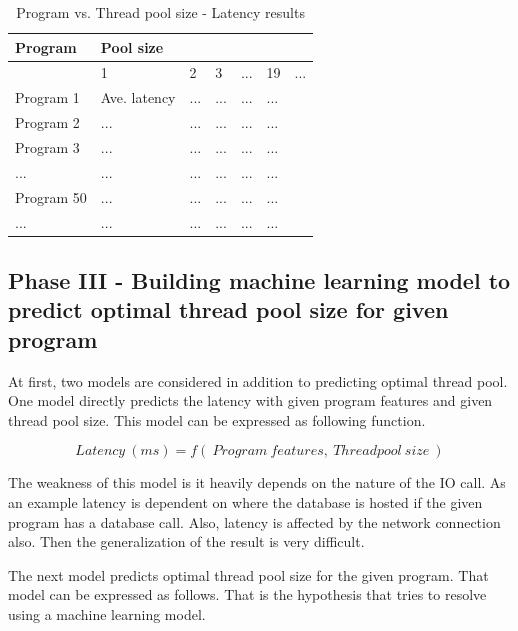 \begin{table}[]
	\caption{Program vs. Thread pool size - Latency results}
	\begin{center}
	\begin{tabular}{|l|l|l|l|l|l|l|}
		\hline
		Program    & \multicolumn{6}{l|}{Pool size}        \\ \hline
		& 1            & 2 & 3 & ... & 19 & ... \\ \hline
		Program 1  & Ave. latency    & ...  & ...  & ...  &... &     \\ \hline
		Program 2  &      ...        & ...  & ...  & ...  &... &     \\ \hline
		Program 3  &      ...        & ...  & ...  & ...  &... &     \\ \hline
		...        &      ...        & ...  & ...  & ...  &... &     \\ \hline
		Program 50 &      ...        & ...  & ...  & ...  &... &     \\ \hline
		...        &      ...        & ...  & ...  & ...  &... &     \\ \hline
	\end{tabular}
	\end{center}
	\label{tab:pool_size_latency}
\end{table}

\subsection{Phase III - Building machine learning model to predict optimal thread pool size for given program}\label{sub:phase3}

At first, two models are considered in addition to predicting optimal thread pool. One model directly predicts the latency with given program features and given thread pool size. This model can be expressed as following function. 

$$ Latency \:(ms) = f(\:Program\:features,\:Threadpool\:size\:)$$

The weakness of this model is it heavily depends on the nature of the IO call. As an example latency is dependent on where the database is hosted if the given program has a database call. Also, latency is affected by the network connection also. Then the generalization of the result is very difficult.

The next model predicts optimal thread pool size for the given program. That model can be expressed as follows. That is the hypothesis that tries to resolve using a machine learning model. 

